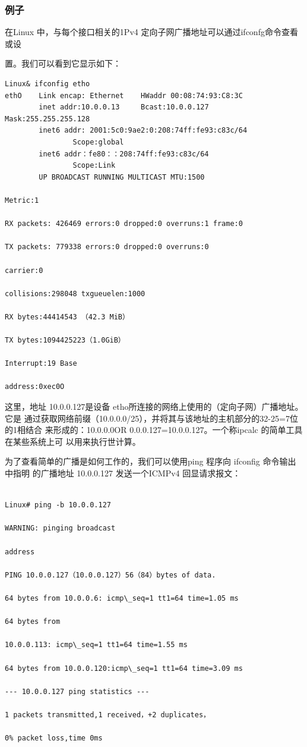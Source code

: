 \subsubsection{例子}
在Linux 中，与每个接口相关的1Pv4 定向子网广播地址可以通过ifconfg命令查看或设

置。我们可以看到它显示如下：
\begin{verbatim}
Linux& ifconfig etho
ethO    Link encap: Ethernet    HWaddr 00:08:74:93:C8:3C
        inet addr:10.0.0.13     Bcast:10.0.0.127   Mask:255.255.255.128
        inet6 addr: 2001:5c0:9ae2:0:208:74ff:fe93:c83c/64
                Scope:global
        inet6 addr：fe80：：208:74ff:fe93:c83c/64
                Scope:Link
        UP BROADCAST RUNNING MULTICAST MTU:1500

Metric:1

RX packets: 426469 errors:0 dropped:0 overruns:1 frame:0

TX packets: 779338 errors:0 dropped:0 overruns:0

carrier:0

collisions:298048 txgueuelen:1000

RX bytes:44414543 （42.3 MiB）

TX bytes:1094425223（1.0GiB）

Interrupt:19 Base

address:0xec0O
\end{verbatim}

这里，地址 10.0.0.127是设备 etho所连接的网络上使用的（定向子网）广播地址。它是
通过获取网络前缀（10.0.0.0/25），并将其与该地址的主机部分的32-25=7位的1相结合
来形成的：10.0.0.0OR 0.0.0.127=10.0.0.127。一个称ipcalc 的简单工具在某些系统上可
以用来执行世计算。

为了查看简单的广播是如何工作的，我们可以使用ping 程序向 ifconfig 命令输出中指明
的广播地址 10.0.0.127 发送一个ICMPv4 回显请求报文：

\begin{verbatim}
    
Linux# ping -b 10.0.0.127

WARNING: pinging broadcast

address

PING 10.0.0.127（10.0.0.127）56（84）bytes of data.

64 bytes from 10.0.0.6: icmp\_seq=1 tt1=64 time=1.05 ms

64 bytes from

10.0.0.113: icmp\_seq=1 tt1=64 time=1.55 ms

64 bytes from 10.0.0.120:icmp\_seq=1 tt1=64 time=3.09 ms

--- 10.0.0.127 ping statistics ---

1 packets transmitted,1 received，+2 duplicates，

0% packet loss,time 0ms
\end{verbatim}

